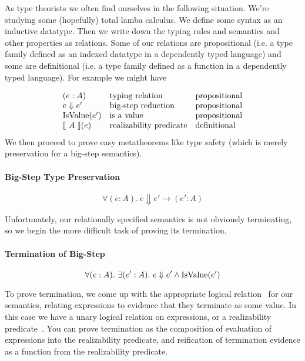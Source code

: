 \documentclass[preprint,nonatbib]{sigplanconf}
\numberwithin{subdefin}{defin}
\theoremstyle{definition}
\numberwithin{subtheorem}{theorem}
\numberwithin{sublemma}{theorem}
\numberwithin{corollary}{theorem}
\numberwithin{case}{theorem}
\numberwithin{slcase}{sublemma}
\numberwithin{scase}{subtheorem}
\numberwithin{lcase}{lemma}
\def\bigstep{\Downarrow}
\def\marr{\rightarrow}
\newcommand{\ascribe}[2]{(#1 : #2)}
\newcommand{\all}[1]{\forall#1.~}
\newcommand{\ex}[1]{\exists#1.~}
\newcommand{\el}[1]{\llbracket ~ #1 ~ \rrbracket}
\newcommand{\fun}[1]{\textmd{#1}}
\begin{document}
As type theorists we often find ourselves in the following situation.
We're studying some (hopefully) total lamba calculus. We define some
syntax as an inductive datatype. Then we write down the typing rules and semantics 
and other properties as relations. Some of our relations are
propositional (i.e. a type family defined as an indexed datatype in a
dependently typed language) and some are definitional (i.e. a type
family defined as a function in a dependently typed language). For
example we might have 

\[
\begin{array}{lll}

\ascribe{e}{A} & \mbox{typing relation} & \mbox{propositional}\\
e \bigstep e' & \mbox{big-step reduction} & \mbox{propositional} \\ 
\fun{IsValue}(e') & \mbox{is a value} & \mbox{propositional}\\
{\el{A}(e)} & \mbox{realizability predicate} & \mbox{definitional}\\

\end{array}
\]
We then proceed to prove easy metatheorems like type safety (which is merely
preservation for a big-step semantics).

\paragraph{Big-Step Type Preservation}

$$
\all{\ascribe{e}{A}} e \bigstep e' \marr \ascribe{e'}{A}
$$



Unfortunately, our relationally specified semantics is not obviously
terminating, so we begin the more difficult task of proving its
termination.

\paragraph{Termination of Big-Step}

$$
\all{\ascribe{e}{A}} \ex{\ascribe{e'}{A}} e \bigstep e' \land \fun{IsValue}(e')
$$

To prove termination, we come up with the appropriate logical
relation~\cite{TODO} for our semantics, relating expressions to evidence
that they terminate as some value.
In this case we have a unary
logical relation on expressions, or a realizability
predicate~\cite{TODO}. You can prove termination as the composition of
evaluation of expressions into the realizability predicate, and reification
of termination evidence as a function from the realizability predicate.
\end{document}
